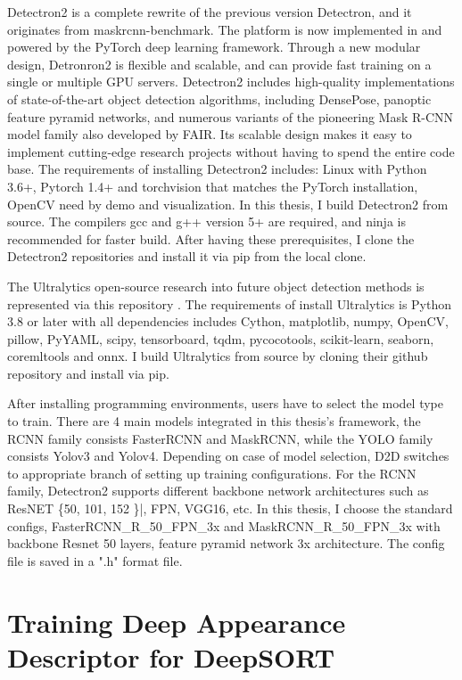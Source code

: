 Detectron2 is a complete rewrite of the previous version Detectron, and it originates from maskrcnn-benchmark. The platform is now implemented in and powered by the PyTorch deep learning framework. Through a new modular design, Detronron2 is flexible and scalable, and can provide fast training on a single or multiple GPU servers. Detectron2 includes high-quality implementations of state-of-the-art object detection algorithms, including DensePose, panoptic feature pyramid networks, and numerous variants of the pioneering Mask R-CNN model family also developed by FAIR. Its scalable design makes it easy to implement cutting-edge research projects without having to spend the entire code base. The requirements of installing Detectron2 includes: Linux with Python 3.6+, Pytorch 1.4+ and torchvision that matches the PyTorch installation, OpenCV need by demo and visualization. In this thesis, I build Detectron2 from source. The compilers gcc and g++ version 5+ are required, and ninja is recommended for faster build. After having these prerequisites, I clone the Detectron2 repositories and install it via pip from the local clone.

The Ultralytics open-source research into future object detection methods is represented via this repository \cite{ultralytics}. The requirements of install Ultralytics is Python 3.8 or later with all dependencies includes Cython, matplotlib, numpy, OpenCV, pillow, PyYAML, scipy, tensorboard, tqdm, pycocotools, scikit-learn, seaborn, coremltools and onnx. I build Ultralytics from source by cloning their github repository and install via pip.

After installing programming environments, users have to select the model type to train. There are 4 main models integrated in this thesis's framework, the RCNN family consists FasterRCNN and MaskRCNN, while the YOLO family consists Yolov3 and Yolov4. Depending on case of model selection, D2D switches to appropriate branch of setting up training configurations. For the RCNN family, Detectron2 supports different backbone network architectures such as ResNET \{50, 101, 152 \}|, FPN, VGG16, etc. In this thesis, I choose the standard configs, FasterRCNN\_R\_50\_FPN\_3x and MaskRCNN\_R\_50\_FPN\_3x with backbone Resnet 50 layers, feature pyramid network 3x architecture. The config file is saved in a ".h" format file.
\section{Training Deep Appearance Descriptor for DeepSORT}
